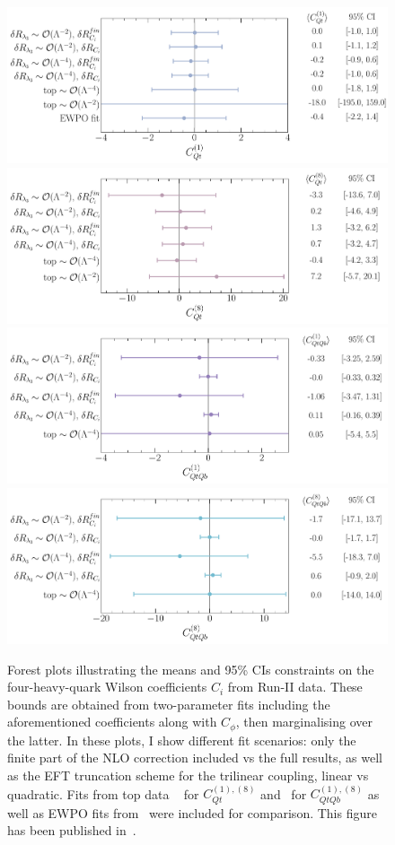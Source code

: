 	\begin{figure}[htpb!]
		\vspace*{-0.5cm}
		\begin{center}
			\includegraphics[width=0.75\linewidth]{fig/uebeblick_Cqt1}
			\includegraphics[width=0.75\linewidth]{fig/uebeblick_Cqt8} 
			\includegraphics[width=0.75\linewidth]{fig/uebeblick_Cqtqb1}
			\includegraphics[width=0.75\linewidth]{fig/uebeblick_Cqtqb8}
		\end{center}
		\vspace*{-0.5cm}
		\caption{Forest plots illustrating the means and 95\% CIs constraints on the four-heavy-quark Wilson coefficients $C_i$ from Run-II data. These bounds are obtained from two-parameter fits including the aforementioned coefficients along with $C_\phi$, then marginalising over the latter. In these plots, I show different fit scenarios: only the finite part of the NLO correction included vs the full results, as well as the EFT truncation scheme for the trilinear coupling, linear vs quadratic. Fits from top data ~\cite{Ethier:2021bye} for $C_{Qt}^{(1),(8)}$ and~\cite{Hartland:2019bjb} for $C_{QtQb}^{(1),(8)}$ as well as EWPO fits from~\cite{Dawson:2022bxd} were included for comparison. This figure has been published in~\cite{Alasfar:2022zyr}.}
		\label{fig:summ4f}
	\end{figure}
